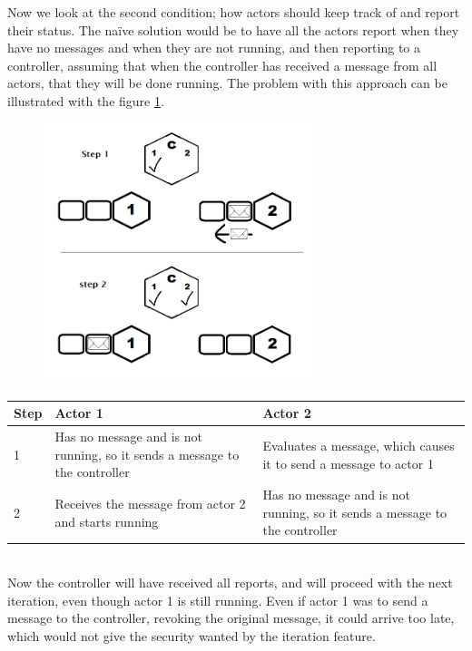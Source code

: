 Now we look at the second condition; how actors should keep track of and report their status.
The naïve solution would be to have all the actors report when they have no messages and when they are not running, and then reporting to a controller, assuming that when the controller has received a message from all actors, that they will be done running. The problem with this approach can be illustrated with the figure \cref{iterationproblem_img}. 

\begin{figure}[htbp]
\centering
\includegraphics[width=0.7\textwidth]{Analysis/Supercomputing/iterationproblem.png}\label{iterationproblem_img}
\end{figure}

\begin{tabular}{ | p{1cm} | p{6cm} | p{6cm} | }%
\hline
Step & Actor 1 & Actor 2 \\\hline
1 & Has no message and is not running, so it sends a message to the controller & Evaluates a message, which causes it to send a message to actor 1 \\\hline
2 & Receives the message from actor 2 and starts running & Has no message and is not running, so it sends a message to the controller \\\hline
\end{tabular}\\

Now the controller will have received all reports, and will proceed with the next iteration, even though actor 1 is still running. Even if actor 1 was to send a message to the controller, revoking the original message, it could arrive too late, which would not give the security wanted by the iteration feature.

